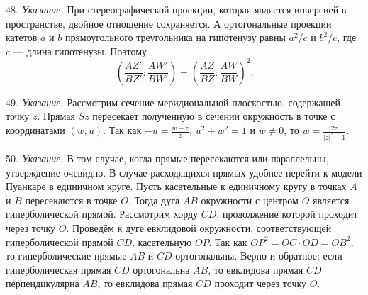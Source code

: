 	48. \textit{Указание.} При стереографической проекции, которая является инверсией в пространстве, двойное отношение сохраняется. А ортогональные проекции катетов $a$ и $b$ прямоугольного треугольника на гипотенузу равны $a^2/c$ и $b^2/c$, где $c$ --- длина гипотенузы. Поэтому
	\[
		\left(\frac{AZ'}{BZ'} : \frac{AW'}{BW'}\right) = \left(\frac{AZ}{BZ} : \frac{AW}{BW}\right)^2.
	\]
 
	49. \textit{Указание.} Рассмотрим сечение меридиональной плоскостью, содержащей точку $z$. Прямая $Sz$ пересекает полученную в сечении окружность в точке с координатами $(w, u)$. Так как $-u = \frac{w - z}{z}$, $u^2 + w^2 = 1$ и $w \neq 0$, то $w = \frac{2z}{|z|^2 + 1}$.
 
	50. \textit{Указание.} В том случае, когда прямые пересекаются или параллельны, утверждение очевидно. В случае расходящихся прямых удобнее перейти к модели Пуанкаре в единичном круге. Пусть касательные к единичному кругу в точках $A$ и $B$ пересекаются в точке $O$. Тогда дуга $AB$ окружности с центром $O$ является гиперболической прямой. Рассмотрим хорду $CD$, продолжение которой проходит через точку $O$. Проведём к дуге евклидовой окружности, соответствующей гиперболической прямой $CD$, касательную $OP$. Так как $OP^2 = OC \cdot OD = OB^2$, то гиперболические прямые $AB$ и $CD$ ортогональны. Верно и обратное: если гиперболическая прямая $CD$ ортогональна $AB$, то евклидова прямая $CD$ перпендикулярна $AB$, то евклидова прямая $CD$ проходит через точку $O$.
 
%
